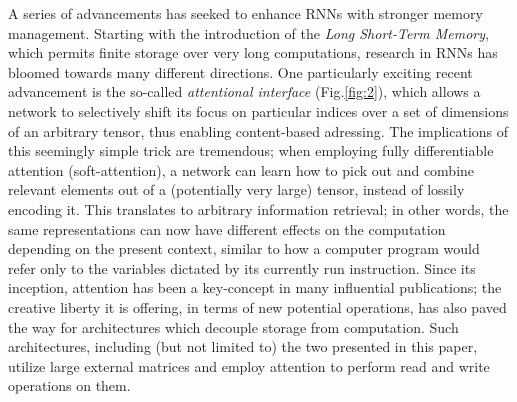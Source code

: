 \documentclass[]{article}
\begin{document}
A series of advancements has seeked to enhance RNNs with stronger memory management. Starting with the introduction of the \textit{Long Short-Term Memory}\cite{Hochreiter:1997:LSM:1246443.1246450,Gers99learningto}, which permits finite storage over very long computations, research in RNNs has bloomed towards many different directions. One particularly exciting recent advancement is the so-called \textit{attentional interface}\cite{NIPS2014_5542,Bahdanau} (Fig.\ref{fig:2}), which allows a network to selectively shift its focus on particular indices over a set of dimensions of an arbitrary tensor, thus enabling content-based adressing. The implications of this seemingly simple trick are tremendous; when employing fully differentiable attention (soft-attention), a network can learn how to pick out and combine relevant elements out of a (potentially very large) tensor, instead of lossily encoding it. This translates to arbitrary information retrieval; in other words, the same representations can now have different effects on the computation depending on the present context, similar to how a computer program would refer only to the variables dictated by its currently run instruction\cite{NIPS2014_5346}. Since its inception, attention has been a key-concept in many influential publications; the creative liberty it is offering, in terms of new potential operations, has also paved the way for architectures which decouple storage from computation. Such architectures, including (but not limited to) the two presented in this paper, utilize large external matrices and employ attention to perform read and write operations on them.
\end{document}
